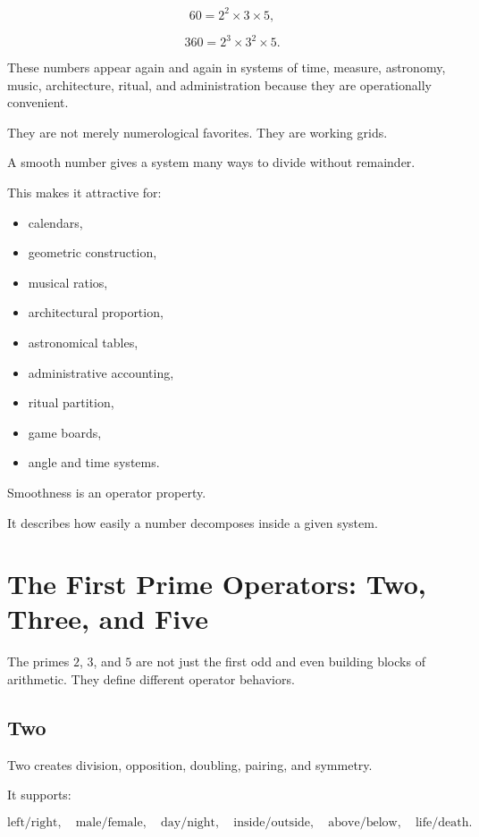 \documentclass[11pt]{book}
\begin{document}
\[
60 = 2^2 \times 3 \times 5,
\]

\[
360 = 2^3 \times 3^2 \times 5.
\]

These numbers appear again and again in systems of time, measure, astronomy, music, architecture, ritual, and administration because they are operationally convenient.

They are not merely numerological favorites. They are working grids.

A smooth number gives a system many ways to divide without remainder.

This makes it attractive for:

\begin{itemize}
    \item calendars,
    \item geometric construction,
    \item musical ratios,
    \item architectural proportion,
    \item astronomical tables,
    \item administrative accounting,
    \item ritual partition,
    \item game boards,
    \item angle and time systems.
\end{itemize}

Smoothness is an operator property.

It describes how easily a number decomposes inside a given system.

\section{The First Prime Operators: Two, Three, and Five}

The primes \(2\), \(3\), and \(5\) are not just the first odd and even building blocks of arithmetic. They define different operator behaviors.

\subsection{Two}

Two creates division, opposition, doubling, pairing, and symmetry.

It supports:

\[
\text{left/right},
\quad
\text{male/female},
\quad
\text{day/night},
\quad
\text{inside/outside},
\quad
\text{above/below},
\quad
\text{life/death}.
\]
\end{document}
